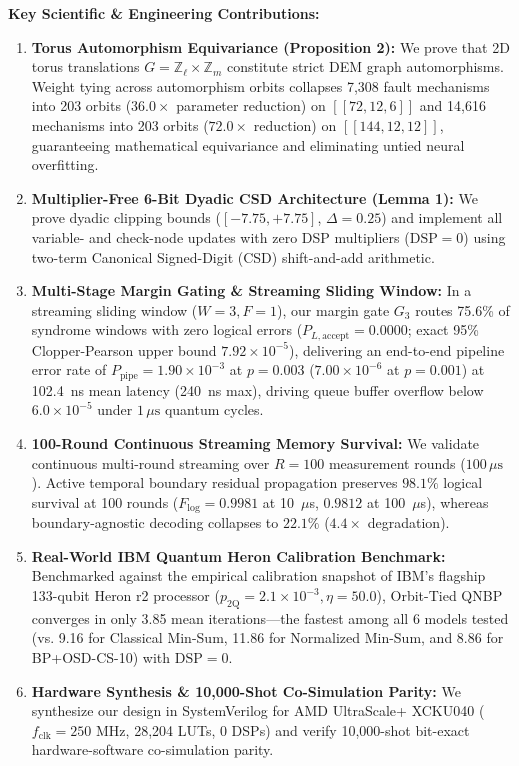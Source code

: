 \documentclass[11pt,a4paper]{article}
\begin{document}
\noindent
\textbf{Key Scientific \& Engineering Contributions:}
\begin{enumerate}
    \item \textbf{Torus Automorphism Equivariance (Proposition 2):} We prove that 2D torus translations $G = \mathbb{Z}_\ell \times \mathbb{Z}_m$ constitute strict DEM graph automorphisms. Weight tying across automorphism orbits collapses 7,308 fault mechanisms into 203 orbits ($36.0\times$ parameter reduction) on $[[72,12,6]]$ and 14,616 mechanisms into 203 orbits ($72.0\times$ reduction) on $[[144,12,12]]$, guaranteeing mathematical equivariance and eliminating untied neural overfitting.
    \item \textbf{Multiplier-Free 6-Bit Dyadic CSD Architecture (Lemma 1):} We prove dyadic clipping bounds ($[-7.75, +7.75]$, $\Delta=0.25$) and implement all variable- and check-node updates with zero DSP multipliers ($\text{DSP}=0$) using two-term Canonical Signed-Digit (CSD) shift-and-add arithmetic.
    \item \textbf{Multi-Stage Margin Gating \& Streaming Sliding Window:} In a streaming sliding window ($W=3, F=1$), our margin gate $G_3$ routes 75.6\% of syndrome windows with zero logical errors ($P_{L, \text{accept}} = 0.0000$; exact 95\% Clopper-Pearson upper bound $7.92 \times 10^{-5}$), delivering an end-to-end pipeline error rate of $P_{\text{pipe}} = 1.90 \times 10^{-3}$ at $p=0.003$ ($7.00 \times 10^{-6}$ at $p=0.001$) at 102.4~ns mean latency (240~ns max), driving queue buffer overflow below $6.0 \times 10^{-5}$ under $1\,\mu\text{s}$ quantum cycles.
    \item \textbf{100-Round Continuous Streaming Memory Survival:} We validate continuous multi-round streaming over $R=100$ measurement rounds ($100\,\mu\text{s}$). Active temporal boundary residual propagation preserves $98.1\%$ logical survival at 100 rounds ($F_{\text{log}} = 0.9981$ at 10~$\mu$s, $0.9812$ at 100~$\mu$s), whereas boundary-agnostic decoding collapses to $22.1\%$ ($4.4\times$ degradation).
    \item \textbf{Real-World IBM Quantum Heron Calibration Benchmark:} Benchmarked against the empirical calibration snapshot of IBM's flagship 133-qubit Heron r2 processor ($p_{\text{2Q}} = 2.1 \times 10^{-3}, \eta = 50.0$), Orbit-Tied QNBP converges in only 3.85 mean iterations---the fastest among all 6 models tested (vs. 9.16 for Classical Min-Sum, 11.86 for Normalized Min-Sum, and 8.86 for BP+OSD-CS-10) with $\text{DSP}=0$.
    \item \textbf{Hardware Synthesis \& 10,000-Shot Co-Simulation Parity:} We synthesize our design in SystemVerilog for AMD UltraScale+ XCKU040 ($f_{\text{clk}} = 250\text{ MHz}$, 28,204 LUTs, 0 DSPs) and verify 10,000-shot bit-exact hardware-software co-simulation parity.
\end{enumerate}
\end{document}
